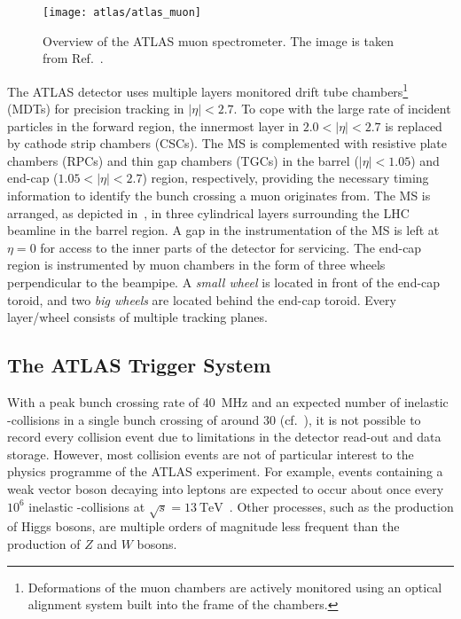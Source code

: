 \begin{figure}[htbp]
  \centering

  \texttt{[image: atlas/atlas\_muon]}

  \caption{Overview of the ATLAS muon spectrometer. The image is taken from
    Ref.~\cite{PERF-2007-01}.}%
  \label{fig:atlas_muon_system}
\end{figure}

The ATLAS detector uses multiple layers monitored drift tube
chambers\footnote{Deformations of the muon chambers are actively monitored using
  an optical alignment system built into the frame of the chambers.} (MDTs) for
precision tracking in $|\eta| < 2.7$. To cope with the large rate of incident
particles in the forward region, the innermost layer in $2.0 < |\eta| < 2.7$ is
replaced by cathode strip chambers (CSCs). The MS is complemented with resistive
plate chambers (RPCs) and thin gap chambers (TGCs) in the barrel
($|\eta| < 1.05$) and end-cap ($1.05 < |\eta| < 2.7$) region, respectively,
providing the necessary timing information to identify the bunch crossing a muon
originates from. The MS is arranged, as depicted
in~, in three cylindrical layers surrounding the LHC
beamline in the barrel region. A gap in the instrumentation of the MS is left at
$\eta = 0$ for access to the inner parts of the detector for servicing. The
end-cap region is instrumented by muon chambers in the form of three wheels
perpendicular to the beampipe. A \emph{small wheel} is located in front of the
end-cap toroid, and two \emph{big wheels} are located behind the end-cap
toroid. Every layer/wheel consists of multiple tracking planes.


\subsection{The ATLAS Trigger System}%
\label{sec:atlas_trigger}

With a peak bunch crossing rate of \SI{40}{\mega\hertz} and an expected number
of inelastic \pp-collisions in a single bunch crossing of around \num{30} (cf.\
), it is not possible to record every collision event due
to limitations in the detector read-out and data storage. However, most
collision events are not of particular interest to the physics programme of the
ATLAS experiment. For example, events containing a weak vector boson decaying
into leptons are expected to occur about once every $10^6$ inelastic
\pp-collisions at $\sqrt{s} = \SI{13}{\TeV}$~\cite{STDM-2015-03}. Other
processes, such as the production of Higgs bosons, are multiple orders of
magnitude less frequent than the production of $Z$ and $W$ bosons.

